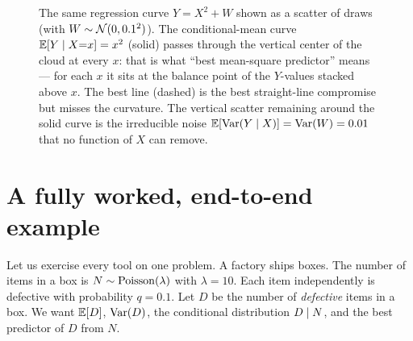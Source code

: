 \begin{figure}[H]
\centering
{}
\caption{The same regression curve $Y = X^2 + W$ shown as a scatter of draws (with $W \sim \mathcal{N}(0, 0.1^2)$). The conditional-mean curve
$\operatorname{\mathbb{E}}[Y\mid X{=}x] = x^2$ (solid) passes through the vertical center of the cloud at every $x$: that is
what ``best mean-square predictor'' means --- for each $x$ it sits at the balance point of the
$Y$-values stacked above $x$. The best line (dashed) is the best straight-line compromise but misses the
curvature. The vertical scatter remaining around the solid curve is the irreducible noise
$\operatorname{\mathbb{E}}[\operatorname{Var}(Y\mid X)] = \operatorname{Var}(W) = 0.01$ that no function of $X$ can remove.}
\label{ch15:fig-scatter}
\end{figure}

\section{A fully worked, end-to-end example}
\label{ch15:worked}

Let us exercise every tool on one problem. A factory ships boxes. The number of items in a box is
$N \sim \operatorname{Poisson}(\lambda)$ with $\lambda = 10$. Each item independently is defective with probability
$q = 0.1$. Let $D$ be the number of \emph{defective} items in a box. We want $\operatorname{\mathbb{E}}[D]$, $\operatorname{Var}(D)$, the
conditional distribution $D \mid N$, and the best predictor of $D$ from $N$.

